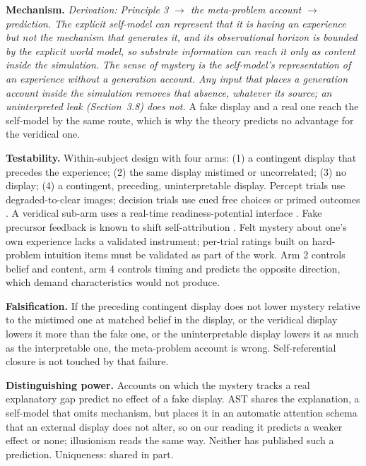 \documentclass[12pt]{article}
\begin{document}
\textbf{Mechanism.} \emph{Derivation: Principle 3 $\rightarrow$ the meta-problem account $\rightarrow$ prediction. The explicit self-model can represent that it is having an experience but not the mechanism that generates it, and its observational horizon is bounded by the explicit world model, so substrate information can reach it only as content inside the simulation. The sense of mystery is the self-model's representation of an experience without a generation account. Any input that places a generation account inside the simulation removes that absence, whatever its source; an uninterpreted leak (Section~3.8) does not.} A fake display and a real one reach the self-model by the same route, which is why the theory predicts no advantage for the veridical one.

\textbf{Testability.} Within-subject design with four arms: (1) a contingent display that precedes the experience; (2) the same display mistimed or uncorrelated; (3) no display; (4) a contingent, preceding, uninterpretable display. Percept trials use degraded-to-clear images; decision trials use cued free choices or primed outcomes \citep{WegnerWheatley1999}. A veridical sub-arm uses a real-time readiness-potential interface \citep{SchultzeKraft2016}. Fake precursor feedback is known to shift self-attribution \citep{Valins1966,BanksIsham2009,Aarts2005}. Felt mystery about one's own experience lacks a validated instrument; per-trial ratings built on hard-problem intuition items \citep{Diaz2021,GottliebLombrozo2018} must be validated as part of the work. Arm 2 controls belief and content, arm 4 controls timing and predicts the opposite direction, which demand characteristics would not produce.

\textbf{Falsification.} If the preceding contingent display does not lower mystery relative to the mistimed one at matched belief in the display, or the veridical display lowers it more than the fake one, or the uninterpretable display lowers it as much as the interpretable one, the meta-problem account is wrong. Self-referential closure is not touched by that failure.

\textbf{Distinguishing power.} Accounts on which the mystery tracks a real explanatory gap predict no effect of a fake display. AST \citep{GrazianoWebb2015} shares the explanation, a self-model that omits mechanism, but places it in an automatic attention schema that an external display does not alter, so on our reading it predicts a weaker effect or none; illusionism reads the same way. Neither has published such a prediction. Uniqueness: shared in part.
\end{document}
